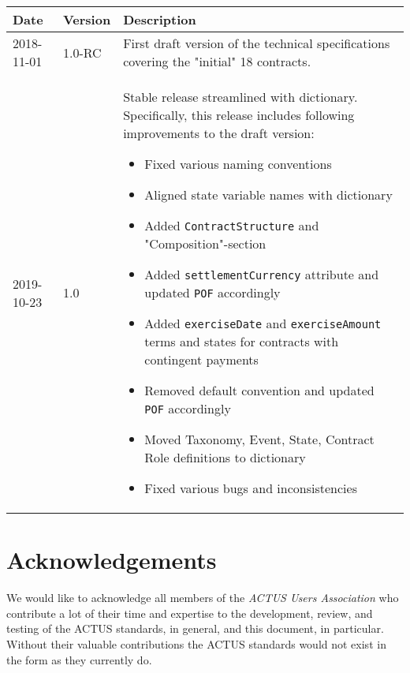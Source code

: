 \documentclass[9pt,oneside]{amsart}
\newcommand{\attr}[1]{\texttt{#1}}
\begin{document}
\begin{table}[H]
  \centering
  \begin{tabular}{| p{} | p{} | p{} |}
  \hline
  Date & Version & Description \\
  \hline
  2018-11-01 & 1.0-RC & First draft version of the technical specifications covering the "initial" 18 contracts.\\
  \hline
  2019-10-23 & 1.0 & Stable release streamlined with dictionary. Specifically, this release includes following improvements to the draft version:
	\begin{itemize}
		\item Fixed various naming conventions
		\item Aligned state variable names with dictionary
		\item Added \attr{ContractStructure} and "Composition"-section
		\item Added \attr{settlementCurrency} attribute and updated \attr{POF} accordingly
		\item Added \attr{exerciseDate} and \attr{exerciseAmount} terms and states for contracts with contingent payments
		\item Removed default convention and updated \attr{POF} accordingly
		\item Moved Taxonomy, Event, State, Contract Role definitions to dictionary
		\item Fixed various bugs and inconsistencies
	\end{itemize} \\
  \hline
  \end{tabular}
\end{table}


\section*{Acknowledgements}\label{sec:ack}

We would like to acknowledge all members of the \textit{ACTUS Users Association} who contribute a lot of their time and expertise to the development, review, and testing of the ACTUS standards, in general, and this document, in particular. Without their valuable contributions the ACTUS standards would not exist in the form as they currently do.



\newpage
\tableofcontents
\end{document}
